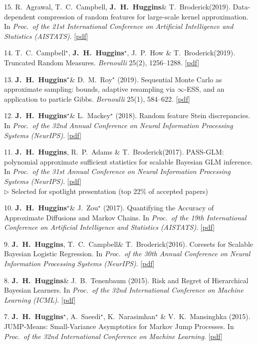 \documentclass[margin,line]{res}
\newcommand{\me}{\textbf{J.~H.~Huggins}\xspace}
\newcommand{\mestar}{\textbf{J.~H.~Huggins}$^{\star}$\xspace}
\newcommand{\trevor}{T.~C.~Campbell\xspace}
\newcommand{\trevorstar}{T.~C.~Campbell$^{\star}$\xspace}
\newcommand{\tamara}{T.~Broderick\xspace}
\newcommand{\paperref}[1]{[\href{#1}{pdf}]}
\newcommand{\paperref}[1]{}
\begin{document}
\begin{resume}
15. R.~Agrawal, \trevor, \me \& \tamara (2019).
Data-dependent compression of random features for large-scale kernel approximation.
In \emph{Proc.~of the 21st International Conference on Artificial Intelligence and Statistics (AISTATS)}.
\paperref{https://arxiv.org/abs/1810.04249}

14. \trevorstar, \mestar, J.~P.~How \& \tamara (2019).
Truncated Random Measures.
\emph{Bernoulli} 25(2), 1256--1288.
\paperref{http://arxiv.org/abs/1603.00861}

13.  \mestar \& D.~M.~Roy$^{\star}$ (2019).
Sequential Monte Carlo as approximate sampling: bounds, adaptive resampling via $\infty$-ESS, and an application to particle Gibbs.
\emph{Bernoulli} 25(1), 584--622.
\paperref{http://arxiv.org/abs/1503.00966}

12. \mestar \& L.~Mackey$^{\star}$ (2018).
Random feature Stein discrepancies.
In \emph{Proc.\ of the 32nd Annual Conference on Neural Information Processing Systems (NeurIPS)}.
\paperref{https://arxiv.org/abs/1806.07788}

11. \me, R.~P.~Adams \& \tamara (2017).
PASS-GLM: polynomial approximate sufficient statistics for scalable Bayesian GLM inference.
In \emph{Proc.\ of the 31st Annual Conference on Neural Information Processing Systems (NeurIPS)}.
\paperref{http://arxiv.org/abs/1709.09216} \\
\quad$\rhd$ Selected for spotlight presentation (top 22\% of accepted papers)

10. \mestar \& J.~Zou$^{\star}$ (2017).
Quantifying the Accuracy of Approximate Diffusions and Markov Chains.
In \emph{Proc.~of the 19th International Conference on Artificial Intelligence and Statistics (AISTATS)}.
\paperref{http://arxiv.org/abs/1605.06420}

9. \me, \trevor \& \tamara (2016).
Coresets for Scalable Bayesian Logistic Regression.
In \emph{Proc.~of the 30th Annual Conference on Neural Information Processing Systems (NeurIPS)}.
\paperref{http://arxiv.org/abs/1605.06423}

8. \me \& J.~B.~Tenenbaum (2015).
Risk and Regret of Hierarchical Bayesian Learners.
In \emph{Proc.~of the 32nd International Conference on Machine Learning (ICML)}.
\paperref{http://arxiv.org/abs/1505.04984}

7. \mestar, A.~Saeedi$^{\star}$, K.~Narasimhan$^{\star}$ \& V.~K.~Mansinghka (2015).
JUMP-Means: Small-Variance Asymptotics for Markov Jump Processes.
In \emph{Proc.~of the 32nd International Conference on Machine Learning}.
\paperref{http://arxiv.org/abs/1503.00332}


\end{resume}
\end{document}
